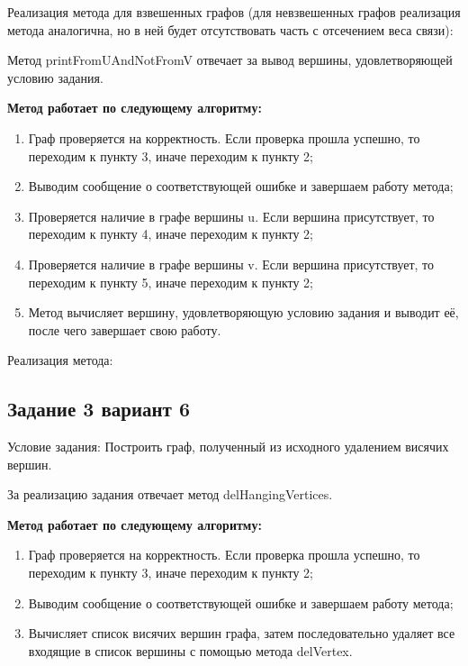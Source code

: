 \documentclass[bachelor, och, pract]{SCWorks}
\begin{document}
Реализация метода для взвешенных графов (для невзвешенных графов реализация
метода аналогична, но в ней будет отсутствовать часть с отсечением веса связи):
\smallskip


\bigskip

Метод printFromUAndNotFromV отвечает за вывод вершины, удовлетворяющей условию задания.
\smallskip

\textbf{Метод работает по следующему алгоритму:}

\begin{enumerate}
  \item {Граф проверяется на корректность. Если проверка прошла успешно,
  то переходим к пункту 3, иначе переходим к пункту 2;}
  \item {Выводим сообщение о соответствующей ошибке и завершаем работу метода;}
  \item {Проверяется наличие в графе вершины u. Если вершина присутствует, то переходим
  к пункту 4, иначе переходим к пункту 2;}
  \item {Проверяется наличие в графе вершины v. Если вершина присутствует, то переходим
  к пункту 5, иначе переходим к пункту 2;}
  \item {Метод вычисляет вершину, удовлетворяющую условию задания и выводит её,
  после чего завершает свою работу.}
\end{enumerate}

Реализация метода:
\smallskip


\bigskip

\subsection{Задание 3 вариант 6}

Условие задания: Построить граф, полученный из исходного удалением висячих вершин.
\bigskip

За реализацию задания отвечает метод delHangingVertices.
\bigskip

\textbf{Метод работает по следующему алгоритму:}

\begin{enumerate}
  \item {Граф проверяется на корректность. Если проверка прошла успешно,
  то переходим к пункту 3, иначе переходим к пункту 2;}
  \item {Выводим сообщение о соответствующей ошибке и завершаем работу метода;}
  \item {Вычисляет список висячих вершин графа, затем последовательно удаляет
  все входящие в список вершины с помощью метода delVertex.}
\end{enumerate}
\end{document}
